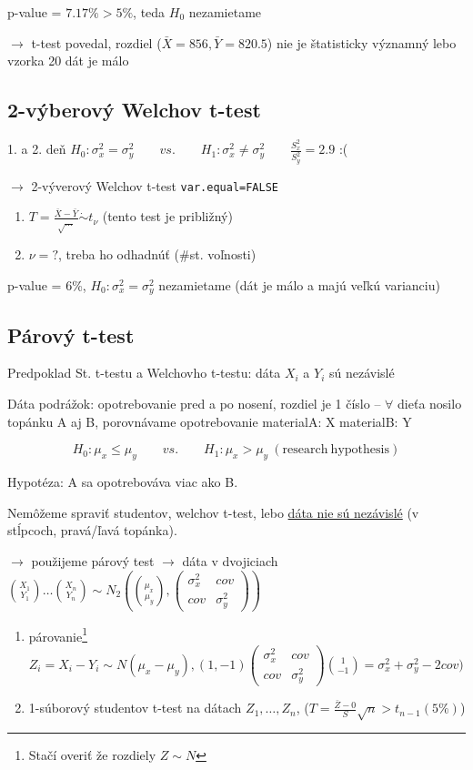 \documentclass[unknownkeysallowed]{article}
\begin{document}
p-value = $7.17\% > 5\%$, teda $H_0$ nezamietame

$\to$ t-test povedal, rozdiel ($\bar{X}=856, \bar{Y}=820.5$) nie je štatisticky významný lebo vzorka 20 dát je málo

\subsection*{2-výberový Welchov t-test}
1. a 2. deň		$H_0: \sigma_x^2 = \sigma_y^2 \qquad vs. \qquad H_1: \sigma_x^2 \neq \sigma_y^2 \qquad \frac{S_x^2}{S_y^2} = 2.9$ :(

$\to$ 2-výverový Welchov t-test \qquad \texttt{var.equal=FALSE}
\begin{enumerate}
\item $T = \frac{\bar{X}-\bar{Y}}{\sqrt{\ldots}} \dot{\sim} t_\nu$ (tento test je približný)
\item $\nu = ?$, treba ho odhadnúť (\#st. voľnosti)
\end{enumerate}

p-value = 6\%, $H_0: \sigma_x^2 = \sigma_y^2$ nezamietame (dát je málo a majú veľkú varianciu)

\subsection*{Párový t-test}
Predpoklad St. t-testu a Welchovho t-testu: dáta $X_i$ a $Y_i$ sú nezávislé

Dáta podrážok: opotrebovanie pred a po nosení, rozdiel je 1 číslo
-- $\forall$ dieťa nosilo topánku A aj B, porovnávame opotrebovanie \qquad materialA: X \qquad materialB: Y

$$H_0: \mu_x \leq \mu_y \qquad vs. \qquad H_1: \mu_x > \mu_y \mathrm{~(research~hypothesis)} $$

Hypotéza: A sa opotrebováva viac ako B.

Nemôžeme spraviť studentov, welchov t-test, lebo \underline{dáta nie sú nezávislé} (v stĺpcoch, pravá/ľavá topánka).

$\to$ použijeme párový test $\to$ dáta v dvojiciach $\binom{X_1}{Y_1}\ldots\binom{X_n}{Y_n} \sim N_2\left(\binom{\mu_x}{\mu_y}, \left(\begin{matrix}
  \sigma_x^2 & cov \\
  cov & \sigma_y^2
 \end{matrix}\right)\right)$
 
\begin{enumerate}
\item párovanie\footnote{Stačí overiť že rozdiely $Z \sim N$} $Z_i = X_i - Y_i \sim N(\mu_x-\mu_y), (1, -1)\left(\begin{matrix}
  \sigma_x^2 & cov \\
  cov & \sigma_y^2
 \end{matrix}\right)\binom{1}{-1} = \sigma_x^2 + \sigma_y^2 - 2cov)$
\item 1-súborový studentov t-test na dátach $Z_1, \ldots, Z_n$, ($T = \frac{\bar{Z}-0}{S}\sqrt{n} > t_{n-1}(5\%)$)
\end{enumerate}
\end{document}
